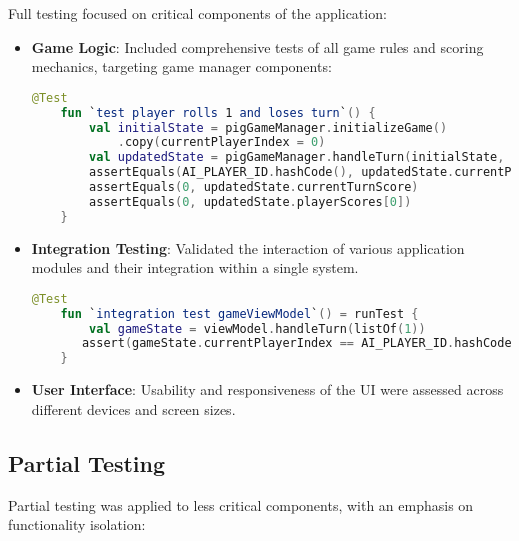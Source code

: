 Full testing focused on critical components of the application:
\begin{itemize}
    \item \textbf{Game Logic}: Included comprehensive tests of all game rules and scoring mechanics, targeting game manager components:
    \begin{lstlisting}[language=Kotlin, caption=Unit Test for Game Logic, label=lst:game_logic_unit]
    @Test
    fun `test player rolls 1 and loses turn`() {
        val initialState = pigGameManager.initializeGame()
            .copy(currentPlayerIndex = 0)
        val updatedState = pigGameManager.handleTurn(initialState, 1) 
        assertEquals(AI_PLAYER_ID.hashCode(), updatedState.currentPlayerIndex)
        assertEquals(0, updatedState.currentTurnScore)
        assertEquals(0, updatedState.playerScores[0])
    } 
    \end{lstlisting}

    \item \textbf{Integration Testing}: Validated the interaction of various application modules and their integration within a single system.
    \begin{lstlisting}[language=Kotlin, caption=Integration Test for Game View Model, label=lst:integration_game_view_model]
    @Test
    fun `integration test gameViewModel`() = runTest {
        val gameState = viewModel.handleTurn(listOf(1))
       assert(gameState.currentPlayerIndex == AI_PLAYER_ID.hashCode())
    } 
    \end{lstlisting}
    
    \item \textbf{User Interface}: Usability and responsiveness of the UI were assessed across different devices and screen sizes.
\end{itemize}

\subsection{Partial Testing}

Partial testing was applied to less critical components, with an emphasis on functionality isolation:

